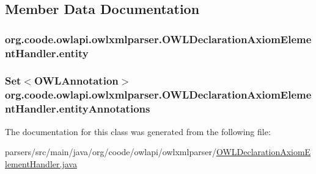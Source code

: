 \subsection{Member Data Documentation}
\hypertarget{classorg_1_1coode_1_1owlapi_1_1owlxmlparser_1_1_o_w_l_declaration_axiom_element_handler_a6001d51abd2564681e1f57e1f397b780}{
\subsubsection[{entity}]{ org.\-coode.\-owlapi.\-owlxmlparser.\-O\-W\-L\-Declaration\-Axiom\-Element\-Handler.\-entity\hspace{0.3cm}{\ttfamily [private]}}}\label{classorg_1_1coode_1_1owlapi_1_1owlxmlparser_1_1_o_w_l_declaration_axiom_element_handler_a6001d51abd2564681e1f57e1f397b780}
\hypertarget{classorg_1_1coode_1_1owlapi_1_1owlxmlparser_1_1_o_w_l_declaration_axiom_element_handler_afa891979bb37b2e2b2218ea75e76fbf8}{
\subsubsection[{entity\-Annotations}]{\setlength{\rightskip}{0pt plus 5cm}Set$<${\bf O\-W\-L\-Annotation}$>$ org.\-coode.\-owlapi.\-owlxmlparser.\-O\-W\-L\-Declaration\-Axiom\-Element\-Handler.\-entity\-Annotations\hspace{0.3cm}{\ttfamily [private]}}}\label{classorg_1_1coode_1_1owlapi_1_1owlxmlparser_1_1_o_w_l_declaration_axiom_element_handler_afa891979bb37b2e2b2218ea75e76fbf8}


The documentation for this class was generated from the following file\-:\begin{DoxyCompactItemize}
\item 
parsers/src/main/java/org/coode/owlapi/owlxmlparser/\hyperlink{_o_w_l_declaration_axiom_element_handler_8java}{O\-W\-L\-Declaration\-Axiom\-Element\-Handler.\-java}\end{DoxyCompactItemize}
